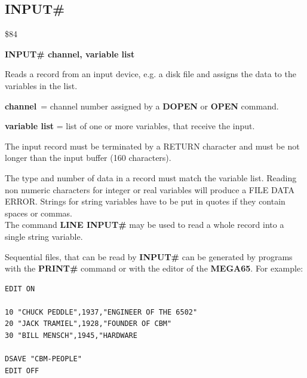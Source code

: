 
\newpage
\subsection{INPUT\#}
\begin{description}[leftmargin=2cm,style=nextline]
\item [Token:] \$84
\item [Format:] {\bf INPUT\# channel, variable list}
\item [Usage:] Reads a record
               from an input device, e.g. a disk file
               and assigns the data
               to the variables in the list.

               {\bf channel} = channel number assigned
               by a {\bf DOPEN} or {\bf OPEN} command.

               {\bf variable list} = list of one or more
               variables, that receive the input.

               The input record must be terminated by a
               RETURN character and must be not longer than
               the input buffer (160 characters).

\item [Remarks:] The type and number of data in a record must
               match the variable list.
               Reading non numeric characters for integer or real
               variables will produce a FILE DATA ERROR.
               Strings for string variables have to be put in quotes
               if they contain spaces or commas. \\
               The command {\bf LINE INPUT\#} may be used to
               read a whole record into a single string variable.

               Sequential files, that can be read by {\bf INPUT\#}
               can be generated by programs with the {\bf PRINT\#}
               command or with the editor of the {\bf MEGA65}.
               For example:

\begin{tcolorbox}[colback=black,coltext=white]
\verbatimfont{\codefont}
\begin{verbatim}
EDIT ON

10 "CHUCK PEDDLE",1937,"ENGINEER OF THE 6502"
20 "JACK TRAMIEL",1928,"FOUNDER OF CBM"
30 "BILL MENSCH",1945,"HARDWARE

DSAVE "CBM-PEOPLE"
EDIT OFF
\end{verbatim}
\end{tcolorbox}


\end{description}
